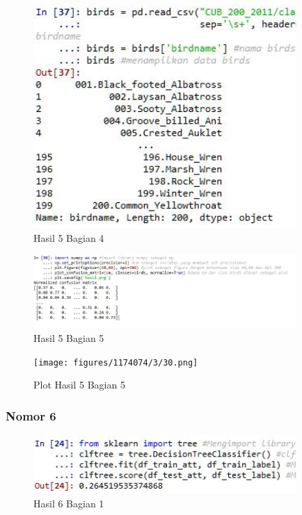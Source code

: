 
\begin{figure}[H]
\centerline{\includegraphics[width=10cm]{figures/1174074/3/28.jpg}}
\caption{Hasil 5 Bagian 4}
\label{labelgambar}
\end{figure}


\begin{figure}[H]
\centerline{\includegraphics[width=10cm]{figures/1174074/3/29.jpg}}
\caption{Hasil 5 Bagian 5}
\label{labelgambar}
\end{figure}

\begin{figure}[H]
\centerline{\texttt{[image: figures/1174074/3/30.png]}}
\caption{Plot Hasil 5 Bagian 5}
\label{labelgambar}
\end{figure}

\subsubsection{Nomor 6}
\hfill\break

\begin{figure}[H]
\centerline{\includegraphics[width=10cm]{figures/1174074/3/31.jpg}}
\caption{Hasil 6 Bagian 1}
\label{labelgambar}
\end{figure}

